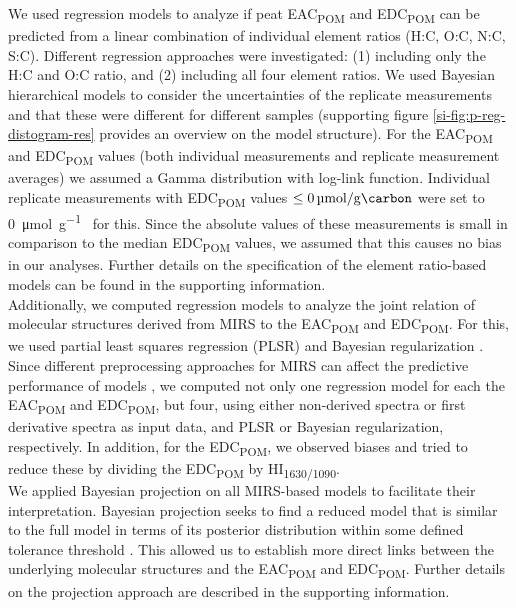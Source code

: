 \documentclass[draft,linenumbers]{agujournal2018}
\begin{document}
We used regression models to analyze if peat EAC\textsubscript{POM} and
EDC\textsubscript{POM} can be predicted from a linear combination of
individual element ratios (H:C, O:C, N:C, S:C). Different regression
approaches were investigated: (1) including only the H:C and O:C ratio,
and (2) including all four element ratios. We used Bayesian hierarchical
models to consider the uncertainties of the replicate measurements and
that these were different for different samples (supporting figure
\ref{si-fig:p-reg-distogram-res} provides an overview on the model
structure). For the EAC\textsubscript{POM} and EDC\textsubscript{POM}
values (both individual measurements and replicate measurement averages)
we assumed a Gamma distribution with log-link function. Individual
replicate measurements with EDC\textsubscript{POM} values
\(\le \SI{0}{\micro\mol\per\gram\carbon}\) were set to
\SI{0}{\micro\mol\per\gram\carbon} for this. Since the absolute values
of these measurements is small in comparison to the median
EDC\textsubscript{POM} values, we assumed that this causes no bias in
our analyses. Further details on the specification of the element
ratio-based models can be found in the supporting information.\\
Additionally, we computed regression models to analyze the joint
relation of molecular structures derived from MIRS to the
EAC\textsubscript{POM} and EDC\textsubscript{POM}. For this, we used
partial least squares regression (PLSR) and Bayesian regularization
\citep[e.g.~][]{Artz.2008, Ferragina.2015}. Since different
preprocessing approaches for MIRS can affect the predictive performance
of models \citep{Engel.2013}, we computed not only one regression model
for each the EAC\textsubscript{POM} and EDC\textsubscript{POM}, but
four, using either non-derived spectra or first derivative spectra as
input data, and PLSR or Bayesian regularization, respectively. In
addition, for the EDC\textsubscript{POM}, we observed biases and tried
to reduce these by dividing the EDC\textsubscript{POM} by
HI\textsubscript{1630/1090}.\\
We applied Bayesian projection \citep{Piironen.2020} on all MIRS-based
models to facilitate their interpretation. Bayesian projection seeks to
find a reduced model that is similar to the full model in terms of its
posterior distribution within some defined tolerance threshold
\citep{Piironen.2020}. This allowed us to establish more direct links
between the underlying molecular structures and the
EAC\textsubscript{POM} and EDC\textsubscript{POM}. Further details on
the projection approach are described in the supporting information.\\
\end{document}
